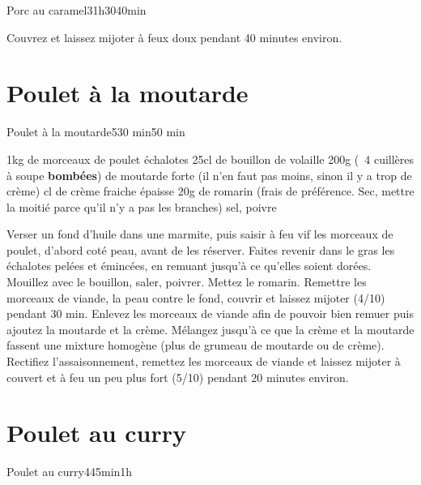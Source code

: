 {\begin{recette}{Porc au caramel}{3}{1h30}{40min}
\begin{cuisson}
Couvrez et laissez mijoter à feux doux pendant 40 minutes environ.
\end{cuisson}
\end{recette}

\section{Poulet à la moutarde}
\begin{recette}{Poulet à la moutarde}{5}{30 min}{50 min}
\begin{ingredients}[6 pers.]
\ingredient 1kg de morceaux de poulet
 échalotes
\ingredient 25cl de bouillon de volaille
\ingredient 200g (~4 cuillères à soupe \textbf{bombées}) de moutarde forte (il n'en faut pas moins, sinon il y a trop de crème)
 cl de crème fraiche épaisse
\ingredient 20g de romarin (frais de préférence. Sec, mettre la moitié parce qu'il n'y a pas les branches)
\ingredient sel, poivre
\end{ingredients}

\begin{preparation}
\etape Verser un fond d'huile dans une marmite, puis saisir à feu vif les morceaux de poulet, d'abord coté peau, avant de les réserver.
\etape Faites revenir dans le gras les échalotes pelées et émincées, en remuant jusqu'à ce qu'elles soient dorées.
\etape Mouillez avec le bouillon, saler, poivrer. Mettez le romarin. Remettre les morceaux de viande, la peau contre le fond, couvrir et laissez mijoter (4/10) pendant 30 min.
\etape Enlevez les morceaux de viande afin de pouvoir bien remuer puis ajoutez la moutarde et la crème. Mélangez 
jusqu'à ce que la crème et la moutarde fassent une mixture homogène (plus de grumeau de moutarde ou de crème). 
\etape Rectifiez l'assaisonnement, remettez les morceaux de viande et laissez mijoter à couvert et à feu un peu plus fort (5/10) pendant 20 minutes environ.
\end{preparation}
\end{recette}

\section{Poulet au curry}
\begin{recette}{Poulet au curry}{4}{45min}{1h}


\end{recette}}
